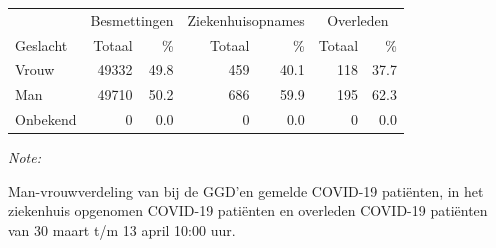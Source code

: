 \documentclass[
  english,
  man,floatsintext]{apa6}
\begin{document}
\begin{table}
\centering\begingroup\fontsize{11}{13}\selectfont

\begin{threeparttable}
\begin{tabular}{lrrrrrr}
\toprule
\multicolumn{1}{c}{ } & \multicolumn{2}{c}{Besmettingen} & \multicolumn{2}{c}{Ziekenhuisopnames} & \multicolumn{2}{c}{Overleden} \\
\cmidrule(l{3pt}r{3pt}){2-3} \cmidrule(l{3pt}r{3pt}){4-5} \cmidrule(l{3pt}r{3pt}){6-7}
Geslacht & Totaal & \% & Totaal & \% & Totaal & \%\\
\midrule
Vrouw & 49332 & 49.8 & 459 & 40.1 & 118 & 37.7\\
Man & 49710 & 50.2 & 686 & 59.9 & 195 & 62.3\\
Onbekend & 0 & 0.0 & 0 & 0.0 & 0 & 0.0\\
\bottomrule
\end{tabular}
\begin{tablenotes}
\item \textit{Note: } 
\item Man-vrouwverdeling van bij de GGD’en gemelde COVID-19 patiënten, in het ziekenhuis opgenomen COVID-19 patiënten en overleden COVID-19 patiënten van 30 maart t/m 13 april 10:00 uur.
\end{tablenotes}
\end{threeparttable}
\endgroup{}
\end{table}
\newpage
\end{document}
